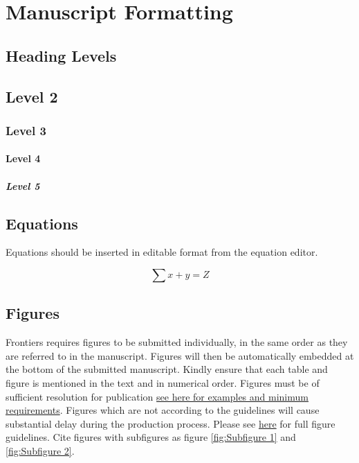 \documentclass[utf8]{FrontiersinHarvard} %
\renewcommand*{\|}[1][]{\nonscript\:#1\vert\nonscript\:\mathopen{}}
\begin{document}

\section{Manuscript Formatting}

\subsection{Heading Levels}


\subsection{Level 2}
\subsubsection{Level 3}
\paragraph{Level 4}
\subparagraph{Level 5}

\subsection{Equations}
Equations should be inserted in editable format from the equation editor.

\begin{equation}
\sum x+ y =Z\label{eq:01}
\end{equation}

\subsection{Figures}
Frontiers requires figures to be submitted individually, in the same order as they are referred to in the manuscript. Figures will then be automatically embedded at the bottom of the submitted manuscript. Kindly ensure that each table and figure is mentioned in the text and in numerical order. Figures must be of sufficient resolution for publication \href{https://www.frontiersin.org/about/author-guidelines#ImageSizeRequirements}{see here for examples and minimum requirements}. Figures which are not according to the guidelines will cause substantial delay during the production process. Please see \href{https://www.frontiersin.org/about/author-guidelines#FigureRequirementsStyleGuidelines}{here} for full figure guidelines. Cite figures with subfigures as figure \ref{fig:Subfigure 1} and \ref{fig:Subfigure 2}.
\end{document}
